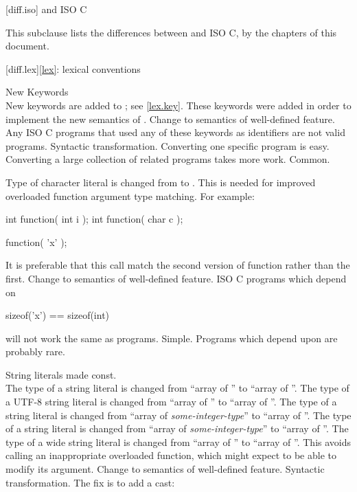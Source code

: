 
[diff.iso]{\Cpp{} and ISO C}

\pnum
{}%
This subclause lists the differences between \Cpp{} and
ISO C, by the chapters of this document.

[diff.lex]{\ref{lex}: lexical conventions}

\change New Keywords\\
New keywords are added to \Cpp{};
see \ref{lex.key}.
\rationale
These keywords were added in order to implement the new
semantics of \Cpp{}.
\effect
Change to semantics of well-defined feature.
Any ISO C programs that used any of these keywords as identifiers
are not valid \Cpp{} programs.
\difficulty
Syntactic transformation.
Converting one specific program is easy.
Converting a large collection
of related programs takes more work.
\howwide
Common.

\change Type of character literal is changed from  to .
\rationale
This is needed for improved overloaded function argument type
matching.
For example:

\begin{codeblock}
int function( int i );
int function( char c );

function( 'x' );
\end{codeblock}

It is preferable that this call match the second version of
function rather than the first.
\effect
Change to semantics of well-defined feature.
ISO C programs which depend on

\begin{codeblock}
sizeof('x') == sizeof(int)
\end{codeblock}

will not work the same as \Cpp{} programs.
\difficulty
Simple.
\howwide
Programs which depend upon  are probably rare.

\change String literals made const.\\
The type of a string literal is changed
from ``array of ''
to ``array of ''.
The type of a UTF-8 string literal is changed
from ``array of ''
to ``array of ''.
The type of a  string literal is changed
from ``array of \textit{some-integer-type}''
to ``array of ''.
The type of a  string literal is changed
from ``array of \textit{some-integer-type}''
to ``array of ''.
The type of a wide string literal is changed
from ``array of ''
to ``array of ''.
\rationale
This avoids calling an inappropriate overloaded function,
which might expect to be able to modify its argument.
\effect
Change to semantics of well-defined feature.
\difficulty
Syntactic transformation. The fix is to add a cast:

